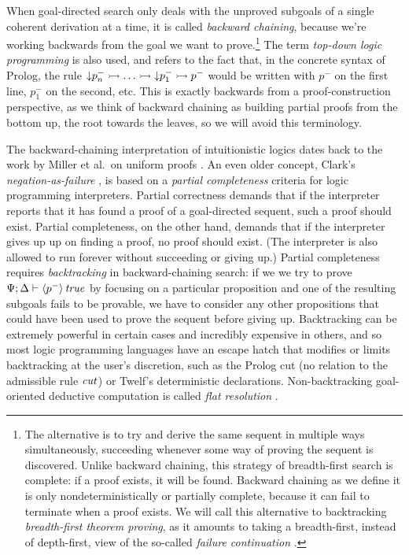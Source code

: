 When goal-directed search only deals with the unproved subgoals of a
single coherent derivation at a time, it is called {\it backward
  chaining}, because we're working backwards from the goal we want to
prove.\footnote{The alternative is to try and derive the same sequent
  in multiple ways simultaneously, succeeding whenever some way of
  proving the sequent is discovered. Unlike backward chaining, this
  strategy of breadth-first search is complete: if a proof exists, it
  will be found.  Backward chaining as we define it is only
  nondeterministically or partially complete, because it can fail to
  terminate when a proof exists. We will call this alternative to
  backtracking {\it breadth-first theorem proving}, as it amounts to
  taking a breadth-first, instead of depth-first, view of the
  so-called {\it failure continuation} \cite{pfenning06backtracking}.}
The term {\it top-down logic programming} is also used, and refers to
the fact that, in the concrete syntax of Prolog, the rule
${\downarrow}p_n^- \rightarrowtail \ldots \rightarrowtail {\downarrow}p_1^- \rightarrowtail p^-$
would be written with $p^-$ on the first line, $p_1^-$ on the second,
etc. This is exactly backwards from a proof-construction perspective,
as we think of backward chaining as building partial proofs from the
bottom up, the root towards the leaves, so we will avoid this
terminology.

The backward-chaining interpretation of intuitionistic logics dates
back to the work by Miller et al.~on uniform proofs
\cite{miller91uniform}.  An even older concept, Clark's {\it
  negation-as-failure} \cite{clark87negation}, is based on a {\it
  partial completeness} criteria for logic programming interpreters.
Partial correctness demands that if the
interpreter reports that it has found a proof of a goal-directed
sequent, such a proof should exist. Partial completeness, on the other
hand, demands that if the interpreter gives up up on finding a proof,
no proof should exist. (The interpreter is also allowed to run forever
without succeeding or giving up.)  Partial completeness requires {\it
  backtracking} in backward-chaining search: if we we try to prove
${\Psi};{\Delta} \vdash {{\langle {p^-} \rangle}\,{{\it true}}} \mathstrut$ by focusing on a particular
proposition and one of the resulting subgoals fails to be provable, we
have to consider any other propositions that could have been used to
prove the sequent before giving up. Backtracking can be extremely
powerful in certain cases and incredibly expensive in others, and so
most logic programming languages have an escape hatch that modifies or
limits backtracking at the user's discretion, such as the Prolog cut
(no relation to the admissible rule ${\it cut}$) or Twelf's
deterministic declarations. Non-backtracking goal-oriented deductive
computation is called {\it flat resolution} \cite{aitkaci99warrens}.


